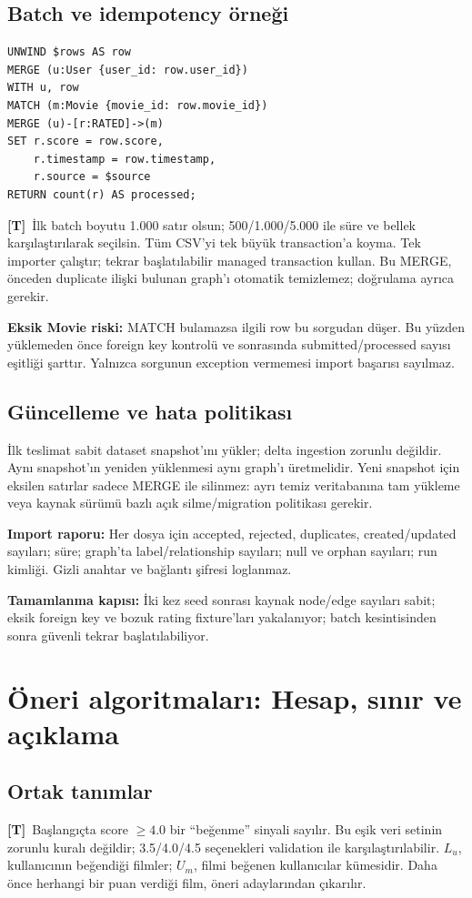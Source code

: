 \documentclass[11pt,a4paper]{article}
\newcommand{\design}{\textbf{[T]}}
\newcommand{\gate}[1]{\par\smallskip\noindent\colorbox{pale}{\parbox{0.96\linewidth}{\textbf{Tamamlanma kapısı:} #1}}\par\smallskip}
\begin{document}
\subsection{Batch ve idempotency örneği}
\begin{lstlisting}
UNWIND $rows AS row
MERGE (u:User {user_id: row.user_id})
WITH u, row
MATCH (m:Movie {movie_id: row.movie_id})
MERGE (u)-[r:RATED]->(m)
SET r.score = row.score,
    r.timestamp = row.timestamp,
    r.source = $source
RETURN count(r) AS processed;
\end{lstlisting}
\design\ İlk batch boyutu 1.000 satır olsun; 500/1.000/5.000 ile süre ve bellek karşılaştırılarak seçilsin. Tüm CSV'yi tek büyük transaction'a koyma. Tek importer çalıştır; tekrar başlatılabilir managed transaction kullan. Bu MERGE, önceden duplicate ilişki bulunan graph'ı otomatik temizlemez; doğrulama ayrıca gerekir.

\textbf{Eksik Movie riski:} MATCH bulamazsa ilgili row bu sorgudan düşer. Bu yüzden yüklemeden önce foreign key kontrolü ve sonrasında submitted/processed sayısı eşitliği şarttır. Yalnızca sorgunun exception vermemesi import başarısı sayılmaz.

\subsection{Güncelleme ve hata politikası}
İlk teslimat sabit dataset snapshot'ını yükler; delta ingestion zorunlu değildir. Aynı snapshot'ın yeniden yüklenmesi aynı graph'ı üretmelidir. Yeni snapshot için eksilen satırlar sadece MERGE ile silinmez: ayrı temiz veritabanına tam yükleme veya kaynak sürümü bazlı açık silme/migration politikası gerekir.

\textbf{Import raporu:} Her dosya için accepted, rejected, duplicates, created/updated sayıları; süre; graph'ta label/relationship sayıları; null ve orphan sayıları; run kimliği. Gizli anahtar ve bağlantı şifresi loglanmaz.

\gate{İki kez seed sonrası kaynak node/edge sayıları sabit; eksik foreign key ve bozuk rating fixture'ları yakalanıyor; batch kesintisinden sonra güvenli tekrar başlatılabiliyor.}

\section{Öneri algoritmaları: Hesap, sınır ve açıklama}
\subsection{Ortak tanımlar}
\design\ Başlangıçta score $\geq4.0$ bir ``beğenme'' sinyali sayılır. Bu eşik veri setinin zorunlu kuralı değildir; 3.5/4.0/4.5 seçenekleri validation ile karşılaştırılabilir. $L_u$, kullanıcının beğendiği filmler; $U_m$, filmi beğenen kullanıcılar kümesidir. Daha önce herhangi bir puan verdiği film, öneri adaylarından çıkarılır.
\end{document}
